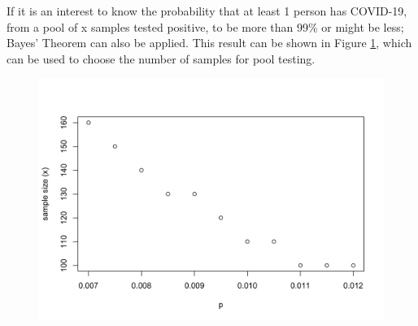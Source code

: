 \documentclass[10pt,leter,openany]{article}
\begin{document}
	If it is an interest to know the probability that at least 1 person has COVID-19, from a pool of x samples tested positive, to be more than 99\% or might be less; Bayes' Theorem can also be applied. This result can be shown in Figure \ref{fig:sample_plot}, which can be used to choose the number of samples for pool testing.

		\begin{figure}
		\begin{center}
			\includegraphics[scale=0.19]{img/sample_plot}
			\label{fig:sample_plot}
		\end{center}
	\end{figure}
		
\clearpage

	
	
	
\end{document}
